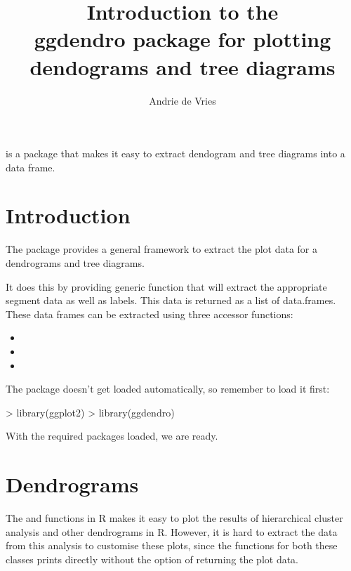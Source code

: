 \documentclass[10pt,oneside]{article}
\begin{document}
\pagestyle{empty}

\setlength{\baselineskip}{1.25em}
\setlength{\parskip}{0.5em}
\setlength{\parindent}{0.0em}

\title{Introduction to the \\ggdendro{} package for plotting dendograms and tree diagrams}
\author{Andrie de Vries}
\maketitle

\ggdendro{} is a package that makes it easy to extract dendogram and tree diagrams into a data frame.  

\section{Introduction}

The \ggdendro{} package provides a general framework to extract the plot data for a dendrograms and tree diagrams.

It does this by providing generic function \dendrodata{} that will extract the appropriate segment data as well as labels.  This data is returned as a list of data.frames.  These data frames can be extracted using three accessor functions:

\begin{itemize}
\item {}
\item {}
\item {}
\end{itemize}

The  package doesn't get loaded automatically, so remember to load it first: 
  
\begin{Schunk}
\begin{Sinput}
> library(ggplot2)
> library(ggdendro)
\end{Sinput}
\end{Schunk}

With the required packages loaded, we are ready.


\section{Dendrograms}

The  and  functions in R makes it easy to plot the results of hierarchical cluster analysis and other dendrograms in R.  However, it is hard to extract the data from this analysis to customise these plots, since the  functions for both these classes prints directly without the option of returning the plot data.  
\end{document}
